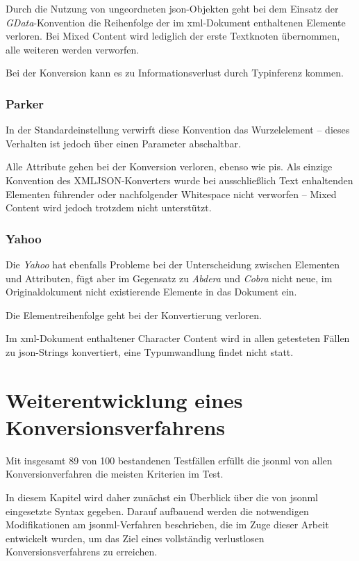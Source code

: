 Durch die Nutzung von ungeordneten \acrshort{json}-Objekten geht bei dem Einsatz der \emph{GData}-Konvention die Reihenfolge der im \acrshort{xml}-Dokument enthaltenen Elemente verloren. Bei Mixed Content wird lediglich der erste Textknoten übernommen, alle weiteren werden verworfen.

Bei der Konversion kann es zu Informationsverlust durch Typinferenz kommen.

\subsection{Parker}
\label{sec:xmljson-parker}

In der Standardeinstellung verwirft diese Konvention das Wurzelelement -- dieses Verhalten ist jedoch über einen Parameter abschaltbar.

Alle Attribute gehen bei der Konversion verloren, ebenso wie \glspl{pi}. Als einzige Konvention des XMLJSON-Konverters wurde bei ausschließlich Text enhaltenden Elementen führender oder nachfolgender Whitespace nicht verworfen -- Mixed Content wird jedoch trotzdem nicht unterstützt.

\subsection{Yahoo}
\label{sec:xmljson-yahoo}

Die \emph{Yahoo} hat ebenfalls Probleme bei der Unterscheidung zwischen Elementen und Attributen, fügt aber im Gegensatz zu \emph{Abdera} und \emph{Cobra} nicht neue, im Originaldokument nicht existierende Elemente in das Dokument ein.

Die Elementreihenfolge geht bei der Konvertierung verloren.

Im \acrshort{xml}-Dokument enthaltener Character Content wird in allen getesteten Fällen zu \acrshort{json}-Strings konvertiert, eine Typumwandlung findet nicht statt.

\chapter{Weiterentwicklung eines Konversionsverfahrens}
\label{chap:jsonml}

Mit insgesamt 89 von 100 bestandenen Testfällen erfüllt die \acrfull{jsonml} von allen Konversionverfahren die meisten Kriterien im Test.

In diesem Kapitel wird daher zunächst ein Überblick über die von \acrshort{jsonml} eingesetzte Syntax gegeben.
Darauf aufbauend werden die notwendigen Modifikationen am \acrshort{jsonml}-Verfahren beschrieben, die im Zuge dieser Arbeit entwickelt wurden, um das Ziel eines vollständig verlustlosen Konversionsverfahrens zu erreichen.

